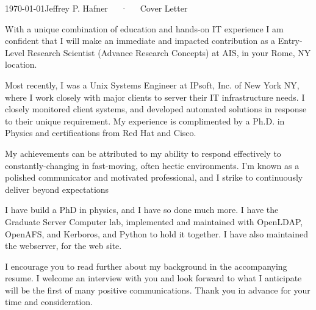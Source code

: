 \documentclass[11pt, letterpaper]{awesome-cv}
\begin{document}
\makecvheader[R]

\makecvfooter
  {\today}{Jeffrey P. Hafner~~~·~~~Cover Letter}{}

\makelettertitle

\begin{cvletter}

With a unique combination of education and hands-on IT experience
    I am confident that I will make an immediate and impacted contribution as a Entry-Level Research Scientist (Advance Research Concepts) at AIS, in your Rome, NY location.
    

Most recently, I was a Unix Systems Engineer at IPsoft, Inc. of New  York NY, where I work closely with major clients to server their IT infrastructure needs.
I closely monitored client systems, and developed automated solutions in response to their unique requirement.
My experience is complimented by a Ph.D. in Physics and certifications from Red Hat and Cisco.

My achievements can be attributed to my ability to respond effectively to constantly-changing in fast-moving, often hectic environments.
    I'm known as a polished communicator and motivated professional, and I strike to continuously deliver beyond expectations


I have build a PhD in physics, and I have so done much more.
I have the Graduate Server Computer lab, implemented and maintained with OpenLDAP, OpenAFS, and Kerboros, and Python to hold it together.
I have also maintained the webserver, for the web site.


I encourage you to read further about my background in the accompanying resume.
I welcome an interview with you and look forward to what I anticipate will be the first of many positive communications.
Thank you in advance for your time and consideration.



\end{cvletter}
\end{document}
